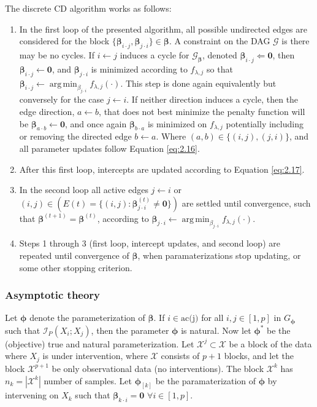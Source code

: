 \documentclass[twoside,11pt]{article}
\DeclareMathOperator*{\argmin}{arg\,min}
\let\mc\mathcal
\begin{document}
The discrete CD algorithm works as follows:\begin{enumerate}[1.]
    \item In the first loop of the presented algorithm, all possible undirected edges are considered for the block $\{\bm{\beta}_{i\cdot j},\bm{\beta}_{j\cdot i}\}\in\bm{\beta}$. A constraint on the DAG $\mc G$ is there may be no cycles. If $i\leftarrow j$ induces a cycle for $\mc{G}_{\bm\beta}$, denoted $\bm{\beta}_{i\cdot j}\Leftarrow \bm 0$, then $\bm{\beta}_{i\cdot j}\gets \bm 0$, and $\bm\beta_{j\cdot i}$ is minimized according to $f_{\lambda,j}$ so that $\bm\beta_{i\cdot j}\gets\argmin_{\beta_{j\cdot i}} f_{\lambda,j}(\cdot)$. This step is done again equivalently but conversely for the case $j \leftarrow i$. If neither direction induces a cycle, then the edge direction, $a\leftarrow b$, that does not best minimize the penalty function will be $\bm\beta_{a\cdot b}\gets \bm 0$, and once again $\bm\beta_{b\cdot a}$ is minimized on $f_{\lambda,j}$ potentially including or removing the directed edge $b\leftarrow a$. Where $(a,b)\in\{(i,j),(j,i)\}$, and all parameter updates follow Equation \eqref{eq:2.16}.
    \item After this first loop, intercepts are updated according to Equation \eqref{eq:2.17}.
    \item In the second loop all active edges $j \leftarrow i$ or $(i,j)\in (E(t)=\{(i,j):\bm\beta_{j\cdot i}^{(t)}\neq \bm 0\})$ are settled until convergence, such that $\bm\beta^{(t+1)}=\bm\beta^{(t)}$, according to $\bm\beta_{j\cdot i}\gets\argmin_{\beta_{j\cdot i}} f_{\lambda,j}(\cdot)$.
    \item Steps 1 through 3 (first loop, intercept updates, and second loop) are repeated until convergence of $\bm\beta$, when paramaterizations stop updating, or some other stopping criterion.
\end{enumerate}

\subsubsection{Asymptotic theory}

Let $\bm\phi$ denote the parameterization of $\bm\beta$. If $i\in\text{ac(j)}$ for all $i,j\in[1,p]$ in $G_{\bm\phi}$ such that $\mc{I}_P(X_i;X_j)$, then the parameter $\bm\phi$ is natural. Now let $\bm\phi^\ast$ be the (objective) true and natural parameterization. Let $\mc{X}^j\subset\mc{X}$ be a block of the data where $X_j$ is under intervention, where $\mc{X}$ consists of $p+1$ blocks, and let the block $\mc{X}^{p+1}$ be only observational data (no interventions). The block $\mc{X}^k$ has $n_k=|\mc{X}^k|$ number of samples. Let $\bm\phi_{[k]}$ be the paramaterization of $\bm\phi$ by intervening on $X_k$ such that $\bm\beta_{k\cdot i}=\bm 0$ $\forall{i}\in[1,p].$
\end{document}
